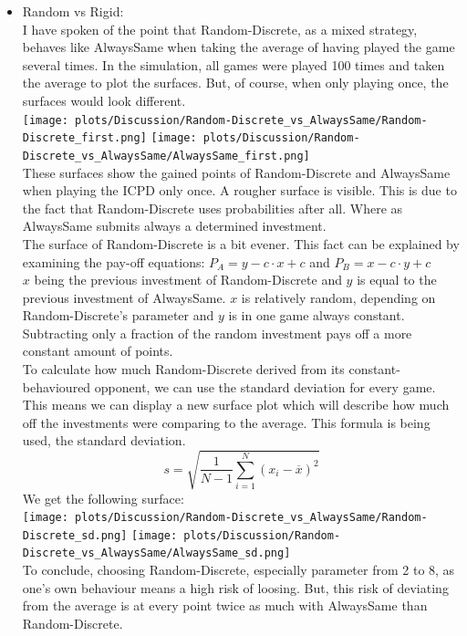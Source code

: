 \documentclass{article}
\begin{document}
\begin{itemize}
	\item Random vs Rigid:\\
		I have spoken of the point that Random-Discrete, as a mixed strategy, behaves like AlwaysSame when taking the average of having played the game several times.
		In the simulation, all games were played 100 times and taken the average to plot the surfaces.
		But, of course, when only playing once, the surfaces would look different.\\
		\texttt{[image: plots/Discussion/Random-Discrete\_vs\_AlwaysSame/Random-Discrete\_first.png]}
		\texttt{[image: plots/Discussion/Random-Discrete\_vs\_AlwaysSame/AlwaysSame\_first.png]}\\
		These surfaces show the gained points of Random-Discrete and AlwaysSame when playing the ICPD only once.
		A rougher surface is visible.
		This is due to the fact that Random-Discrete uses probabilities after all.
		Where as AlwaysSame submits always a determined investment.\\
		The surface of Random-Discrete is a bit evener. 
		This fact can be explained by examining the pay-off equations:
		$P_A = y - c \cdot x + c$ and $P_B = x - c \cdot y + c$\\
		$x$ being the previous investment of Random-Discrete and $y$ is equal to the previous investment of AlwaysSame.
		$x$ is relatively random, depending on Random-Discrete's parameter and $y$ is in one game always constant.
		Subtracting only a fraction of the random investment pays off a more constant amount of points.\\
		To calculate how much Random-Discrete derived from its constant-behavioured opponent, we can use the standard deviation for every game.
		This means we can display a new surface plot which will describe how much off the investments were comparing to the average.
		This formula is being used, the standard deviation.
		$$s = \sqrt{\frac{1}{N-1} \sum_{i=1}^N (x_i - \overline{x})^2}$$
		We get the following surface:\\
		\texttt{[image: plots/Discussion/Random-Discrete\_vs\_AlwaysSame/Random-Discrete\_sd.png]}
		\texttt{[image: plots/Discussion/Random-Discrete\_vs\_AlwaysSame/AlwaysSame\_sd.png]}\\
		To conclude, choosing Random-Discrete, especially parameter from 2 to 8, as one's own behaviour means a high risk of loosing.
		But, this risk of deviating from the average is at every point twice as much with AlwaysSame than Random-Discrete.

\end{itemize}
\end{document}
